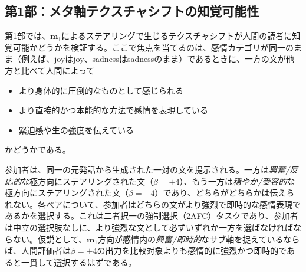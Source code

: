 
\subsection{第1部：メタ軸テクスチャシフトの知覚可能性}

第1部では、$\mathbf{m}_1$によるステアリングで生じるテクスチャシフトが人間の読者に知覚可能かどうかを検証する。ここで焦点を当てるのは、感情カテゴリが同一のまま（例えば、joyはjoy、sadnessはsadnessのまま）であるときに、一方の文が他方と比べて人間によって
\begin{itemize}
    \item より身体的に圧倒的なものとして感じられる
    \item より直接的かつ本能的な方法で感情を表現している
    \item 緊迫感や生の強度を伝えている
\end{itemize}
かどうかである。\par

参加者は、同一の元発話から生成された一対の文を提示される。一方は\textit{興奮/反応的}な極方向にステアリングされた文（$\beta = +4$）、もう一方は\textit{穏やか/受容的}な極方向にステアリングされた文（$\beta = -4$）であり、どちらがどちらかは伝えられない。各ペアについて、参加者はどちらの文がより強烈で即時的な感情表現であるかを選択する。これは二者択一の強制選択（2AFC）タスクであり、参加者は中立の選択肢なしに、より強烈な文として必ずいずれか一方を選ばなければならない。仮説として、$\mathbf{m}_1$方向が感情内の\textit{興奮/即時的}なサブ軸を捉えているならば、人間評価者は$\beta=+4$の出力を比較対象よりも感情的に強烈かつ即時的であると一貫して選択するはずである。\par

